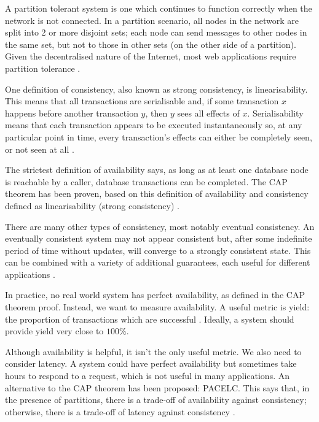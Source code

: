 \documentclass[12pt,a4paper,twoside,openright]{report}
\begin{document}
A partition tolerant system is one which continues to function correctly when the network is not connected. In a partition scenario, all nodes in the network are split into 2 or more disjoint sets; each node can send messages to other nodes in the same set, but not to those in other sets (on the other side of a partition). Given the decentralised nature of the Internet, most web applications require partition tolerance \cite{hale_2010}. %

One definition of consistency, also known as strong consistency, is linearisability. This means that all transactions are serialisable and, if some transaction $x$ happens before another transaction $y$, then $y$ sees all effects of $x$. Serialisability means that each transaction appears to be executed instantaneously so, at any particular point in time, every transaction's effects can either be completely seen, or not seen at all \cite{herlihy1990linearizability}.

The strictest definition of availability says, as long as at least one database node is reachable by a caller, database transactions can be completed. The CAP theorem has been proven, based on this definition of availability and consistency defined as linearisability (strong consistency) \cite{gilbert}.

There are many other types of consistency, most notably eventual consistency. An eventually consistent system may not appear consistent but, after some indefinite period of time without updates, will converge to a strongly consistent state. This can be combined with a variety of additional guarantees, each useful for different applications \cite{vogels_2008}.

In practice, no real world system has perfect availability, as defined in the CAP theorem proof. Instead, we want to measure availability. A useful metric is yield: the proportion of transactions which are successful \cite{fox1999harvest}. Ideally, a system should provide yield very close to $100\%$.

Although availability is helpful, it isn't the only useful metric. We also need to consider latency. A system could have perfect availability but sometimes take hours to respond to a request, which is not useful in many applications. An alternative to the CAP theorem has been proposed: PACELC. This says that, in the presence of partitions, there is a trade-off of availability against consistency; otherwise, there is a trade-off of latency against consistency \cite{abadi2012consistency}.
\end{document}
